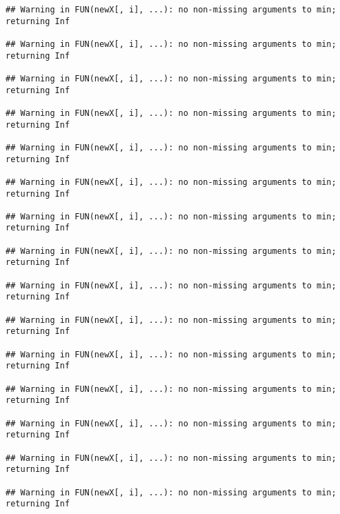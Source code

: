 \documentclass[]{article}
\begin{document}
\begin{verbatim}
## Warning in FUN(newX[, i], ...): no non-missing arguments to min; returning Inf

## Warning in FUN(newX[, i], ...): no non-missing arguments to min; returning Inf

## Warning in FUN(newX[, i], ...): no non-missing arguments to min; returning Inf

## Warning in FUN(newX[, i], ...): no non-missing arguments to min; returning Inf

## Warning in FUN(newX[, i], ...): no non-missing arguments to min; returning Inf

## Warning in FUN(newX[, i], ...): no non-missing arguments to min; returning Inf

## Warning in FUN(newX[, i], ...): no non-missing arguments to min; returning Inf

## Warning in FUN(newX[, i], ...): no non-missing arguments to min; returning Inf

## Warning in FUN(newX[, i], ...): no non-missing arguments to min; returning Inf

## Warning in FUN(newX[, i], ...): no non-missing arguments to min; returning Inf

## Warning in FUN(newX[, i], ...): no non-missing arguments to min; returning Inf

## Warning in FUN(newX[, i], ...): no non-missing arguments to min; returning Inf

## Warning in FUN(newX[, i], ...): no non-missing arguments to min; returning Inf

## Warning in FUN(newX[, i], ...): no non-missing arguments to min; returning Inf

## Warning in FUN(newX[, i], ...): no non-missing arguments to min; returning Inf
\end{verbatim}
\end{document}
